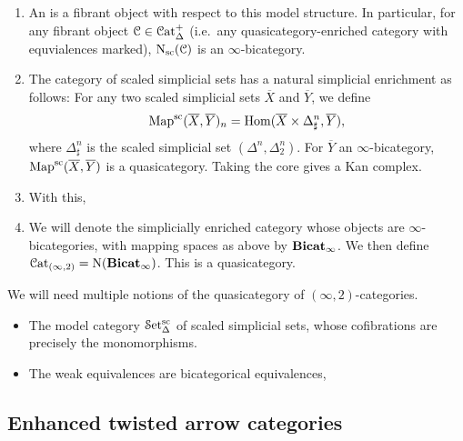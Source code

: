 \documentclass[main.tex]{subfiles}
\begin{document}
\begin{enumerate}
  \item An  is a fibrant object with respect to this model structure. In particular, for any fibrant object $\mathcal{C} \in \mathcal{C}\mathrm{at}_{\Delta}^{+}$ (i.e.\ any quasicategory-enriched category with equvialences marked), $\mathrm{N}_{\mathrm{sc}}(\mathcal{C})$ is an $\infty$-bicategory.

  \item The category of scaled simplicial sets has a natural simplicial enrichment as follows: For any two scaled simplicial sets $\overline{X}$ and $\overline{Y}$, we define
    \begin{equation*}
      \mathrm{Map}^{\mathrm{sc}}(\overline{X}, \overline{Y})_{n} = \mathrm{Hom}(\overline{X} \times \Delta^{n}_{\sharp}, \overline{Y}),
    \end{equation*}
    where $\Delta^{n}_{\sharp}$ is the scaled simplicial set $(\Delta^{n}, \Delta^{n}_{2})$. For $\overline{Y}$ an $\infty$-bicategory, $\mathrm{Map}^{\mathrm{sc}}(\overline{X}, \overline{Y})$ is a quasicategory. Taking the core gives a Kan complex.

  \item With this,

  \item We will denote the simplicially enriched category whose objects are $\infty$-bicategories, with mapping spaces as above by $\mathbf{Bicat}_{\infty}$. We then define $\mathcal{C}\mathrm{at}_{(\infty, 2)} = \mathrm{N}(\mathbf{Bicat}_{\infty})$. This is a quasicategory.
\end{enumerate}

We will need multiple notions of the quasicategory of $(\infty,2)$-categories.
\begin{itemize}
  \item The model category $\mathcal{S}\mathrm{et}_{\Delta}^{\mathrm{sc}}$ of scaled simplicial sets, whose cofibrations are precisely the monomorphisms.

  \item The weak equivalences are bicategorical equivalences,
\end{itemize}

\subsection{Enhanced twisted arrow categories}
\label{ssc:enhanced_twisted_arrow_categories}
\end{document}
